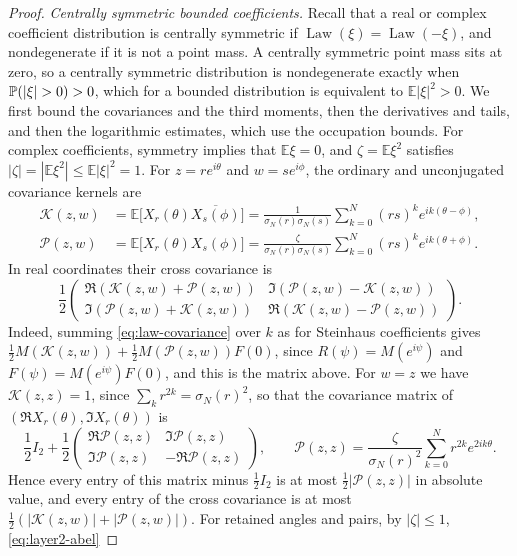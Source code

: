 \begin{proof}
\medskip
\noindent\emph{Centrally symmetric bounded coefficients.}
Recall that a real or complex coefficient distribution is centrally
symmetric if $\operatorname{Law}(\xi)=\operatorname{Law}(-\xi)$, and
nondegenerate if it is not a point mass. A centrally symmetric point mass
sits at zero, so a centrally symmetric distribution is nondegenerate
exactly when $\Prob(|\xi|>0)>0$, which for a bounded distribution is
equivalent to $\mathbb E|\xi|^2>0$.
We first bound the covariances and the third moments, then the
derivatives and tails, and then the logarithmic estimates, which use the
occupation bounds.
For complex coefficients, symmetry implies that $\mathbb E\xi=0$, and
$\zeta=\mathbb E\xi^2$ satisfies
$|\zeta|=|\mathbb E\xi^2|\le\mathbb E|\xi|^2=1$.
For $z=re^{i\theta}$ and $w=se^{i\phi}$, the ordinary and unconjugated
covariance kernels are
\begin{align*}
 \mathcal K(z,w)&=\mathbb E\bigl[X_r(\theta)\overline{X_s(\phi)}\bigr]
 =\frac1{\sigma_N(r)\sigma_N(s)}
       \sum_{k=0}^N(rs)^ke^{ik(\theta-\phi)},\\
 \mathcal P(z,w)&=\mathbb E\bigl[X_r(\theta)X_s(\phi)\bigr]
 =\frac{\zeta}{\sigma_N(r)\sigma_N(s)}
       \sum_{k=0}^N(rs)^ke^{ik(\theta+\phi)}.
\end{align*}
In real coordinates their cross covariance is
\[
 \frac12\begin{pmatrix}
 \Re(\mathcal K(z,w)+\mathcal P(z,w))&\Im(\mathcal P(z,w)-\mathcal K(z,w))\\
 \Im(\mathcal P(z,w)+\mathcal K(z,w))&\Re(\mathcal K(z,w)-\mathcal P(z,w))
 \end{pmatrix}.
\]
Indeed, summing \eqref{eq:law-covariance} over $k$ as for Steinhaus
coefficients gives
$\tfrac12M(\mathcal K(z,w))+\tfrac12M(\mathcal P(z,w))F(0)$, since
$R(\psi)=M(e^{i\psi})$ and $F(\psi)=M(e^{i\psi})F(0)$, and this is the
matrix above.
For $w=z$ we have $\mathcal K(z,z)=1$, since
$\sum_kr^{2k}=\sigma_N(r)^2$, so that the covariance matrix of
$(\Re X_r(\theta),\Im X_r(\theta))$ is
\[
 \frac12I_2+\frac12\begin{pmatrix}\Re\mathcal P(z,z)&\Im\mathcal P(z,z)\\
 \Im\mathcal P(z,z)&-\Re\mathcal P(z,z)\end{pmatrix},\qquad
 \mathcal P(z,z)=\frac{\zeta}{\sigma_N(r)^2}\sum_{k=0}^Nr^{2k}e^{2ik\theta}.
\]
Hence every entry of this matrix minus $\tfrac12I_2$ is at most
$\tfrac12|\mathcal P(z,z)|$ in absolute value, and every entry of the
cross covariance is at most
$\tfrac12(|\mathcal K(z,w)|+|\mathcal P(z,w)|)$.
For retained angles and pairs, by $|\zeta|\le1$, \eqref{eq:layer2-abel}

\end{proof}
